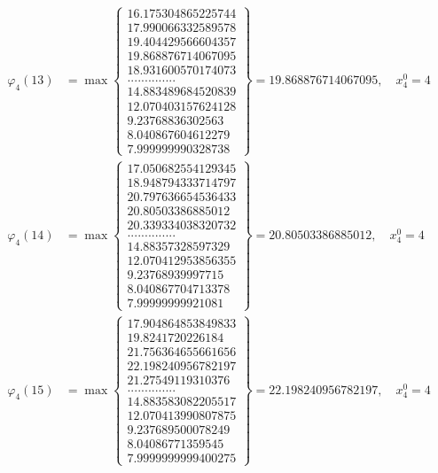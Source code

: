 \documentclass{article}
\begin{document}
\begin{align*}
  
  
  
\varphi_{4}(13) &= \max \left\{ \begin{array}{c}
16.175304865225744 \\
 17.990066332589578 \\
 19.404429566604357 \\
 19.868876714067095 \\
 18.931600570174073 \\
 .............. \\
 14.883489684520839 \\
 12.070403157624128 \\
 9.23768836302563 \\
 8.040867604612279 \\
 7.999999990328738
\end{array} \right\} = 19.868876714067095, \quad x_{4}^0 = 4\\
  
  
  
  
\varphi_{4}(14) &= \max \left\{ \begin{array}{c}
17.050682554129345 \\
 18.948794333714797 \\
 20.797636654536433 \\
 20.80503386885012 \\
 20.339334038320732 \\
 .............. \\
 14.88357328597329 \\
 12.070412953856355 \\
 9.23768939997715 \\
 8.040867704713378 \\
 7.99999999921081
\end{array} \right\} = 20.80503386885012, \quad x_{4}^0 = 4\\
  
  
  
  
\varphi_{4}(15) &= \max \left\{ \begin{array}{c}
17.904864853849833 \\
 19.8241720226184 \\
 21.756364655661656 \\
 22.198240956782197 \\
 21.27549119310376 \\
 .............. \\
 14.883583082205517 \\
 12.070413990807875 \\
 9.237689500078249 \\
 8.04086771359545 \\
 7.9999999999400275
\end{array} \right\} = 22.198240956782197, \quad x_{4}^0 = 4\\
  

\end{align*}
\end{document}
